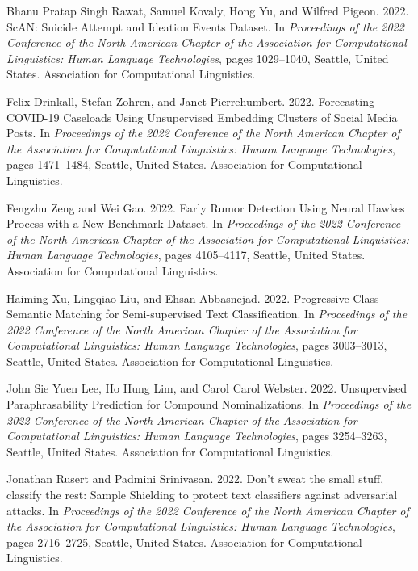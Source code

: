 \documentclass[11pt]{article}
\begin{document}
%
%

\begin{thebibliography}{50}

\bibitem{}
Bhanu Pratap Singh Rawat, Samuel Kovaly, Hong Yu, and Wilfred Pigeon. 2022. ScAN: Suicide Attempt and Ideation Events Dataset. In \emph{Proceedings of the 2022 Conference of the North American Chapter of the Association for Computational Linguistics: Human Language Technologies}, pages 1029–1040, Seattle, United States. Association for Computational Linguistics.

\bibitem{}
Felix Drinkall, Stefan Zohren, and Janet Pierrehumbert. 2022. Forecasting COVID-19 Caseloads Using Unsupervised Embedding Clusters of Social Media Posts. In \emph{Proceedings of the 2022 Conference of the North American Chapter of the Association for Computational Linguistics: Human Language Technologies}, pages 1471–1484, Seattle, United States. Association for Computational Linguistics.

\bibitem{}
Fengzhu Zeng and Wei Gao. 2022. Early Rumor Detection Using Neural Hawkes Process with a New Benchmark Dataset. In \emph{Proceedings of the 2022 Conference of the North American Chapter of the Association for Computational Linguistics: Human Language Technologies}, pages 4105–4117, Seattle, United States. Association for Computational Linguistics.

\bibitem{}
Haiming Xu, Lingqiao Liu, and Ehsan Abbasnejad. 2022. Progressive Class Semantic Matching for Semi-supervised Text Classification. In \emph{Proceedings of the 2022 Conference of the North American Chapter of the Association for Computational Linguistics: Human Language Technologies}, pages 3003–3013, Seattle, United States. Association for Computational Linguistics.

\bibitem{}
John Sie Yuen Lee, Ho Hung Lim, and Carol Carol Webster. 2022. Unsupervised Paraphrasability Prediction for Compound Nominalizations. In \emph{Proceedings of the 2022 Conference of the North American Chapter of the Association for Computational Linguistics: Human Language Technologies}, pages 3254–3263, Seattle, United States. Association for Computational Linguistics.

\bibitem{}
Jonathan Rusert and Padmini Srinivasan. 2022. Don’t sweat the small stuff, classify the rest: Sample Shielding to protect text classifiers against adversarial attacks. In \emph{Proceedings of the 2022 Conference of the North American Chapter of the Association for Computational Linguistics: Human Language Technologies}, pages 2716–2725, Seattle, United States. Association for Computational Linguistics.


\end{thebibliography}
\end{document}

